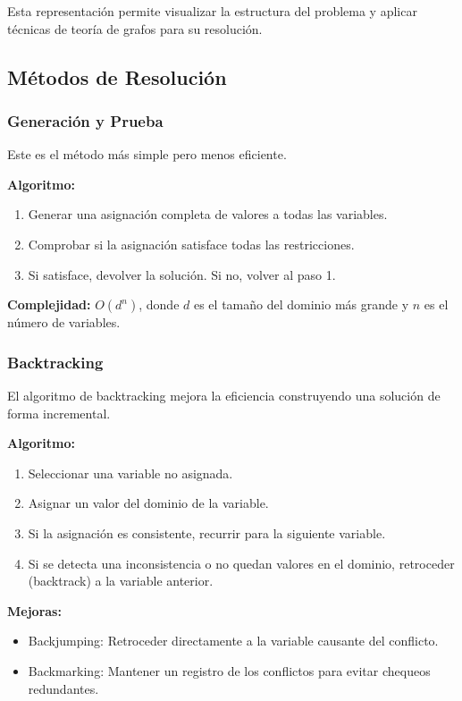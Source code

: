 \documentclass[12pt,a4paper]{report}
\begin{document}
Esta representación permite visualizar la estructura del problema y aplicar técnicas de teoría de grafos para su resolución.

\subsection{Métodos de Resolución}

\subsubsection{Generación y Prueba}
Este es el método más simple pero menos eficiente. 

\textbf{Algoritmo:}
\begin{enumerate}
    \item Generar una asignación completa de valores a todas las variables.
    \item Comprobar si la asignación satisface todas las restricciones.
    \item Si satisface, devolver la solución. Si no, volver al paso 1.
\end{enumerate}

\textbf{Complejidad:} $O(d^n)$, donde $d$ es el tamaño del dominio más grande y $n$ es el número de variables.

\subsubsection{Backtracking}
El algoritmo de backtracking mejora la eficiencia construyendo una solución de forma incremental.

\textbf{Algoritmo:}
\begin{enumerate}
    \item Seleccionar una variable no asignada.
    \item Asignar un valor del dominio de la variable.
    \item Si la asignación es consistente, recurrir para la siguiente variable.
    \item Si se detecta una inconsistencia o no quedan valores en el dominio, retroceder (backtrack) a la variable anterior.
\end{enumerate}

\textbf{Mejoras:}
\begin{itemize}
    \item Backjumping: Retroceder directamente a la variable causante del conflicto.
    \item Backmarking: Mantener un registro de los conflictos para evitar chequeos redundantes.
\end{itemize}
\end{document}
